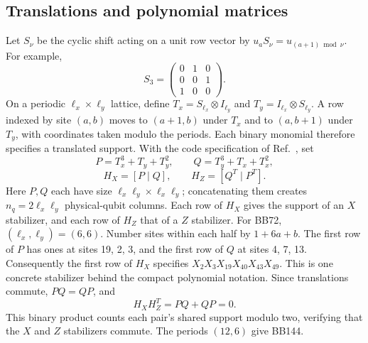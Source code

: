 \subsection{Translations and polynomial matrices}
Let $S_\nu$ be the cyclic shift acting on a unit row vector by $u_aS_\nu=u_{(a+1)\bmod\nu}$. For example,
\[S_3=\begin{pmatrix}0&1&0\\0&0&1\\1&0&0\end{pmatrix}.\]
On a periodic $\ell_x\times\ell_y$ lattice, define $T_x=S_{\ell_x}\otimes I_{\ell_y}$ and $T_y=I_{\ell_x}\otimes S_{\ell_y}$. A row indexed by site $(a,b)$ moves to $(a+1,b)$ under $T_x$ and to $(a,b+1)$ under $T_y$, with coordinates taken modulo the periods. Each binary monomial therefore specifies a translated support. With the code specification of Ref.~\cite{bbpre}, set
\[P=T_x^3+T_y+T_y^2,\qquad Q=T_y^3+T_x+T_x^2,\]
\[H_X=[P\mid Q],\qquad H_Z=[Q^T\mid P^T].\]
Here $P,Q$ each have size $\ell_x\ell_y\times\ell_x\ell_y$; concatenating them creates $n_q=2\ell_x\ell_y$ physical-qubit columns. Each row of $H_X$ gives the support of an $X$ stabilizer, and each row of $H_Z$ that of a $Z$ stabilizer. For BB72, $(\ell_x,\ell_y)=(6,6)$. Number sites within each half by $1+6a+b$. The first row of $P$ has ones at sites 19, 2, 3, and the first row of $Q$ at sites 4, 7, 13. Consequently the first row of $H_X$ specifies $X_2X_3X_{19}X_{40}X_{43}X_{49}$. This is one concrete stabilizer behind the compact polynomial notation. Since translations commute, $PQ=QP$, and
\[H_XH_Z^T=PQ+QP=0.\]
This binary product counts each pair's shared support modulo two, verifying that the $X$ and $Z$ stabilizers commute. The periods $(12,6)$ give BB144.

